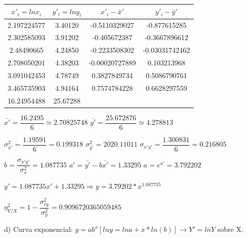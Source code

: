 \documentclass[10pt,a4paper]{article}
\begin{document}
\begin{enumerate}
\vspace{0.25cm}
\begin{center}
\begin{tabular}{|c|c|c|c|}
\hline 
$x'_i = ln x_i$ & $y'_i = ln y_i$ & $x'_i - \bar{x}'$ & $y'_i - \bar{y}'$ \\ 
\hline 
2.197224577 & 3.40120 & -0.5110329027 & -0.877615285 \\ 
\hline 
2.302585093 & 3.91202 & -0.405672387 & -0.3667896612 \\ 
\hline 
2.48490665 & 4.24850 & -0.2233508302 & -0.03031742462 \\ 
\hline 
2.708050201 & 4.38203 & -0.00020727889 & 0.103213968 \\ 
\hline 
3.091042453 & 4.78749 & 0.3827849734 & 0.5086790761 \\ 
\hline 
3.465735903 & 4.94164 & 0.7574784228 & 0.6628297559 \\ 
\hline 
16.24954488 & 25.67288 &   &   \\ 
\hline 
\end{tabular} 
\end{center}

$\bar{x'} = \dfrac{16.2495}{6} \simeq 2.70825748$ \hspace{1.5cm} $\bar{y'} = \dfrac{25.672876}{6} \simeq 4.278813$

\vspace{0.25cm}
$\sigma_{x'}^2 = \dfrac{1.19591}{6} = 0.199318$ \hspace{1.5cm} $\sigma_{y'}^2 = 2020.11011$ \hspace{1.5cm} $\sigma_{x'y'} = \dfrac{1.300831}{6} = 0.216805$

\vspace{0.25cm}
$b = \dfrac{\sigma_{x'y'}}{\sigma_{x}^2} = 1.087735$ \hspace{1.5cm} $a' = \bar{y'} - b \bar{x'} = 1.33295$ \hspace{1.5cm} $a = e^{a'} = 3.792202$

\begin{center}
$y' = 1.087735 x' +1.33295 \Rightarrow y = 3.79202*x^{1.087735}$
\end{center}

\vspace{0.25cm}
$\eta_{Y / X}^2 = 1 - \dfrac{\sigma_{ry}^2}{\sigma_y^2} = 0.9096720365059485$

\vspace{0.5cm}
\hspace{0.25cm} d) Curva exponencial: $y = ab^x [ln y = ln a + x*ln(b)] \rightarrow Y' = ln Y$ sobre X.


\end{enumerate}
\end{document}
